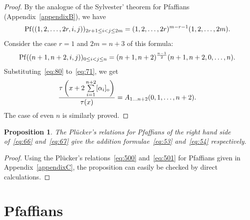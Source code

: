 \documentclass[11pt]{article}
\newtheorem{proposition}{Proposition}
\begin{document}
\begin{proof}
By the analogue of the Sylvester' theorem for Pfaf\/f\/ians (Appendix~\ref{appendixB}), we have
\begin{gather*}%
{\rm Pf}((1,2,\dots,2r,i,j))_{2r+1\le i<j\le2m}=(1,2,\dots,2r)^{m-r-1}(1,2,\dots,2m).
\end{gather*}
Consider the case $r=1$ and $2m=n+3$ of this formula:
\begin{gather}
{\rm Pf}((n+1,n+2,i,j))_{0\le i<j\le n}=(n+1,n+2)^{\frac{n-1}{2}}(n+1,n+2,0,\dots,n).
\label{eq:80}
\end{gather}
Substituting~\eqref{eq:80} to~\eqref{eq:71}, we get
\begin{gather*}%
\frac{\tau\left(x+2\sum\limits_{i=1}^{n+2}[\alpha_i]_{\rm o}\right)}{\tau(x)}=A_{1\dots n+2}(0,1,\dots,n+2).
\end{gather*}
The case of even $n$ is similarly proved.
\end{proof}

\begin{proposition}\label{proposition9}
The Pl\"{u}cker's relations for Pfaffians of the right hand side of~\eqref{eq:66} and~\eqref{eq:67}
give the addition formulae~\eqref{eq:53} and~\eqref{eq:54} respectively.
\end{proposition}

\begin{proof}
Using the Pl\"{u}cker's relations~\eqref{eq:500} and~\eqref{eq:501} for Pfaf\/f\/ians given in Appendix~\ref{appendixC},
the proposition can easily be checked by direct calculations.
\end{proof}
\setcounter{section}{4}
\setcounter{subsection}{0}
\setcounter{subsubsection}{0}
\setcounter{Theorem}{0}
\setcounter{equation}{41}
\appendix

\section{Pfaf\/f\/ians} \label{appendixA}
\end{document}
